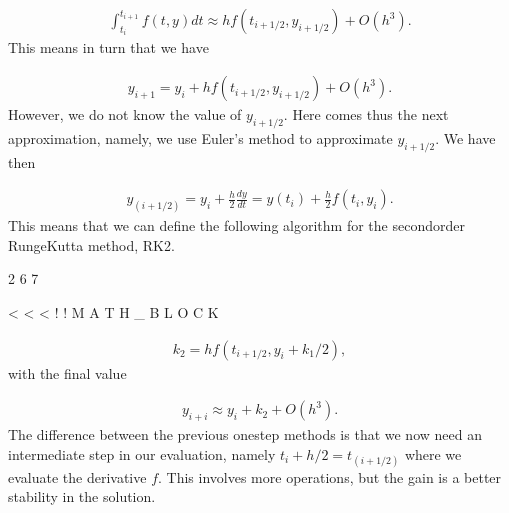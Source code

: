\documentclass[letterpaper,10pt,english]{sphinxmanual}
\begin{document}
\begin{equation*}
\begin{split}
\begin{equation}
\int_{t_i}^{t_{i+1}} f(t,y) dt \approx hf(t_{i+1/2},y_{i+1/2}) +O(h^3).
\label{_auto55} \tag{74}
\end{equation}
\end{split}
\end{equation*}
This means in turn that we have




\begin{equation*}
\begin{split}
\begin{equation}
y_{i+1}=y_i + hf(t_{i+1/2},y_{i+1/2}) +O(h^3).
\label{_auto56} \tag{75}
\end{equation}
\end{split}
\end{equation*}
However, we do not know the value of   \(y_{i+1/2}\). Here comes thus the next approximation, namely, we use Euler’s
method to approximate \(y_{i+1/2}\). We have then




\begin{equation*}
\begin{split}
\begin{equation}
y_{(i+1/2)}=y_i + \frac{h}{2}\frac{dy}{dt}=y(t_i) + \frac{h}{2}f(t_i,y_i).
\label{_auto57} \tag{76}
\end{equation}
\end{split}
\end{equation*}
This means that we can define the following algorithm for
the second\sphinxhyphen{}order Runge\sphinxhyphen{}Kutta method, RK2.

2
6
7

\textless{}
\textless{}
\textless{}
!
!
M
A
T
H
\_
B
L
O
C
K




\begin{equation*}
\begin{split}
\begin{equation}
k_2=hf(t_{i+1/2},y_i+k_1/2),
\label{_auto59} \tag{78}
\end{equation}
\end{split}
\end{equation*}
with the final value




\begin{equation*}
\begin{split}
\begin{equation} 
y_{i+i}\approx y_i + k_2 +O(h^3). 
\label{_auto60} \tag{79}
\end{equation}
\end{split}
\end{equation*}
The difference between the previous one\sphinxhyphen{}step methods
is that we now need an intermediate step in our evaluation,
namely \(t_i+h/2 = t_{(i+1/2)}\) where we evaluate the derivative \(f\).
This involves more operations, but the gain is a better stability
in the solution.
\end{document}
